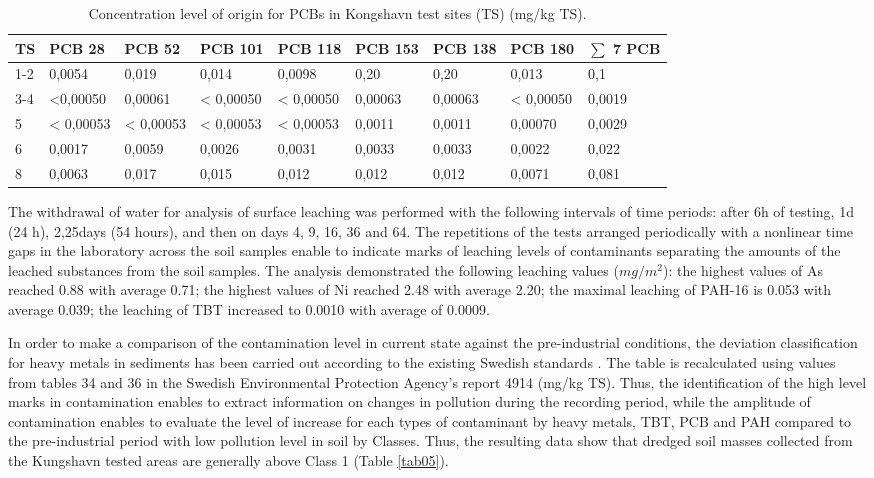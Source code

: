 \documentclass[algorithms,article,submit,pdftex,moreauthors]{Definitions/mdpi}
\begin{document}
\begin{table}[H] 
\caption{Concentration level of origin for PCBs in Kongshavn test sites (TS) (mg/kg TS).\label{tab04}}
\begin{tabularx}{\linewidth}{p{0.5cm}p{1.3cm}p{1.3cm}p{1.3cm}p{1.3cm}p{1.2cm}p{1.2cm}p{1.3cm}p{1.3cm}}
\toprule
\textbf{TS} & \textbf{PCB 28} & \textbf{PCB 52} & \textbf{PCB 101} & \textbf{PCB 118} & \textbf{PCB 153} & \textbf{PCB 138} & \textbf{PCB 180} & \textbf{$\sum$ 7 PCB}\\
\midrule
1-2 & 0,0054   & 0,019     & 0,014 	     & 0,0098  & 0,20        & 0,20       & 0,013         & 0,1 \\
3-4 & <0,00050 & 0,00061 & < 0,00050    & < 0,00050 & 0,00063 & 0,00063 & < 0,00050 & 0,0019 \\
5 & < 0,00053 & < 0,00053  & < 0,00053  & < 0,00053 & 0,0011   & 0,0011     & 0,00070     & 0,0029 \\
6 & 0,0017   & 0,0059 	& 0,0026       & 0,0031  & 0,0033  & 0,0033      & 0,0022      & 0,022 \\
8 & 0,0063   & 0,017 	& 0,015         & 0,012     & 0,012    & 0,012      & 0,0071      & 0,081\\
\bottomrule
\end{tabularx}
\end{table}

The withdrawal of water for analysis of surface leaching was performed with the following intervals of time periods: after 6h of testing, 1d (24 h), 2,25days (54 hours), and then on days 4, 9, 16, 36 and 64. The repetitions of the tests arranged periodically with a nonlinear time gaps in the laboratory across the soil samples enable to indicate marks of leaching levels of contaminants separating the amounts of the leached substances from the soil samples. The analysis demonstrated the following leaching values ($mg/m^2$): the highest values of As reached 0.88 with average 0.71; the highest values of Ni reached 2.48 with average 2.20; the maximal leaching of PAH-16 is 0.053 with average 0.039; the leaching of TBT increased to 0.0010 with average of 0.0009. 

In order to make a comparison of the contamination level in current state against the pre-industrial conditions, the deviation classification for heavy metals in sediments has been carried out according to the existing Swedish standards \cite{ZefferSamuelsson}. The table is recalculated using values from tables 34 and 36 in the Swedish Environmental Protection Agency's report 4914 (mg/kg TS). Thus, the identification of the high level marks in contamination enables to extract information on changes in pollution during the recording period, while the amplitude of contamination enables to evaluate the level of increase for each types of contaminant by heavy metals, TBT, PCB and PAH compared to the pre-industrial period with low pollution level in soil by Classes. Thus, the resulting data show that dredged soil masses collected from the Kungshavn tested areas are generally above Class 1 (Table \ref{tab05}). 
\end{document}
